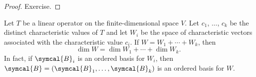 \begin{proof}
    Exercise.
\end{proof}

\begin{lemma}
    Let \(T\) be a linear operator on the finite-dimensional space \(V\). Let \(c_1\), \(\ldots\), \(c_k\) be the distinct characteristic values of \(T\) and let \(W_i\) be the space of characteristic vectors associated with the characteristic value \(c_i\). If \(W=W_1+\cdots+W_k\), then
    \begin{equation*}
        \dim W=\dim W_1+\cdots+\dim W_k.
    \end{equation*}
    In fact, if \(\symcal{B}_i\) is an ordered basis for \(W_i\), then \(\symcal{B}=\left(\symcal{B}_1,\ldots,\symcal{B}_k\right)\) is an ordered basis for \(W\).
\end{lemma}


